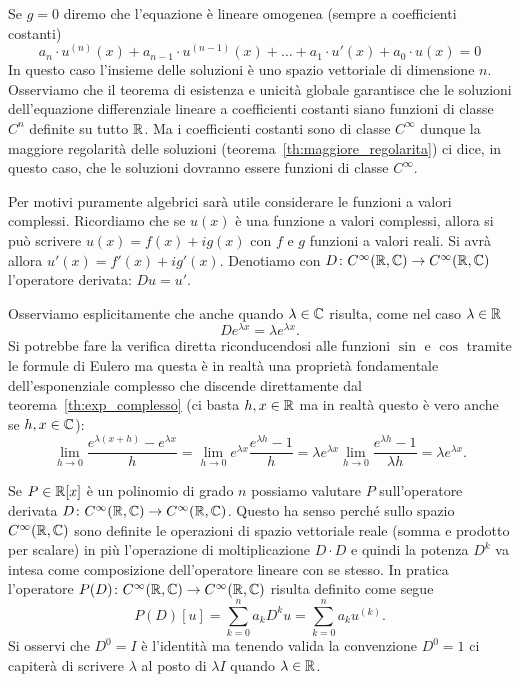Se $g=0$ diremo che l'equazione è lineare omogenea (sempre a coefficienti costanti)
\begin{equation}\label{eq:edo_lineare_omogenea_coeff_costanti}
  a_n \cdot u^{(n)}(x) + a_{n-1} \cdot u^{(n-1)}(x) + \dots + a_1 \cdot u'(x) + a_0 \cdot u(x) = 0 
\end{equation}
In questo caso l'insieme delle soluzioni è uno spazio vettoriale di dimensione $n$.
Osserviamo che il teorema di esistenza e unicità globale garantisce che le soluzioni 
dell'equazione differenziale lineare a coefficienti costanti siano funzioni di 
classe $C^n$ definite su tutto ${\mathbb R}$. 
Ma i coefficienti costanti sono di classe $C^\infty$ dunque la maggiore regolarità delle soluzioni
(teorema~\ref{th:maggiore_regolarita}) 
ci dice, in questo caso, che le soluzioni dovranno essere funzioni di classe $C^\infty$.

Per motivi puramente algebrici sarà utile considerare le funzioni a valori complessi.
Ricordiamo che se $u(x)$ è una funzione a valori complessi,
allora si può scrivere $u(x) = f(x) + i g(x)$ con $f$ e $g$ funzioni a valori reali.
Si avrà allora $u'(x) = f'(x) + ig'(x)$.
Denotiamo con $D \colon C^\infty({\mathbb R}, {\mathbb C})\to C^\infty({\mathbb R}, {\mathbb C})$ l'operatore derivata: $D u = u'$.

Osserviamo esplicitamente che anche quando $\lambda \in {\mathbb C}$ risulta,
come nel caso $\lambda\in {\mathbb R}$
\begin{equation}\label{eq:499375}
  D e^{\lambda x} = \lambda e^{\lambda x}.
\end{equation}
Si potrebbe fare la verifica diretta riconducendosi alle funzioni $\sin$ e $\cos$
tramite le formule di Eulero ma questa
è in realtà una proprietà fondamentale dell'esponenziale complesso
che discende direttamente dal teorema~\ref{th:exp_complesso} (ci basta $h,x\in {\mathbb R}$ ma in realtà 
questo è vero anche se $h,x\in {\mathbb C}$):
\[
 \lim_{h\to 0} \frac{e^{\lambda(x+h)}-e^{\lambda x}}{h}
 = \lim_{h\to 0} e^{\lambda x}\frac{e^{\lambda h}-1}{h}
 = \lambda e^{\lambda x} \lim_{h\to 0}\frac{e^{\lambda h}-1}{\lambda h}
 = \lambda e^{\lambda x}.
\]

Se $P\in {\mathbb R}[x]$ è un polinomio di grado $n$
possiamo valutare $P$ sull'operatore
derivata $D\colon C^\infty({\mathbb R},{\mathbb C})\to C^\infty({\mathbb R},{\mathbb C})$.
Questo ha senso perché sullo spazio $C^\infty({\mathbb R},{\mathbb C})$
sono definite le operazioni di spazio vettoriale reale
(somma e prodotto per scalare) in più l'operazione
di moltiplicazione $D\cdot D$ e quindi la potenza
$D^k$ va intesa come composizione dell'operatore
lineare con se stesso.
In pratica l'operatore
$P(D)\colon C^\infty({\mathbb R},{\mathbb C}) \to C^\infty({\mathbb R},{\mathbb C})$
risulta definito come segue
\[
  P(D)[u] = \sum_{k=0}^n a_k D^k u = \sum_{k=0}^n a_k u^{(k)}.
\]
Si osservi che $D^0 = I$ è l'identità ma tenendo valida
la convenzione $D^0 = 1$ ci capiterà di scrivere
$\lambda$ al posto di $\lambda I$ quando $\lambda\in {\mathbb R}$.

